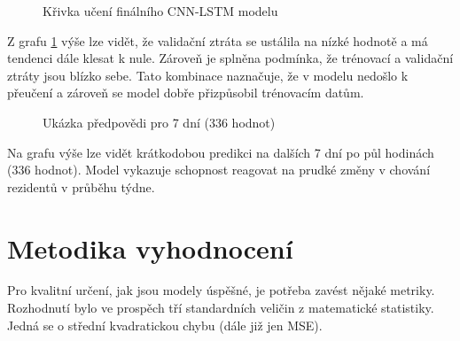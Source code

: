 \documentclass[FM,BP,fonts]{tulthesis}
\begin{document}
\begin{figure}[htbp]
	\centering
	\caption{Křivka učení finálního CNN-LSTM modelu}
	\label{fig:cnn_lstm_learning_curve}
\end{figure}

Z grafu \ref{fig:cnn_lstm_learning_curve} výše lze vidět, že validační ztráta se ustálila na nízké hodnotě a má tendenci dále klesat k nule. Zároveň je splněna podmínka, že  trénovací a validační ztráty jsou blízko sebe. Tato kombinace naznačuje, že v modelu nedošlo k přeučení a zároveň se model dobře přizpůsobil trénovacím datům.

\begin{figure}[htbp]
	\centering
	\caption{Ukázka předpovědi pro 7 dní (336 hodnot)}
	\label{fig:lstm_vyrez}
\end{figure}


Na grafu výše lze vidět krátkodobou predikci na dalších 7 dní po půl hodinách (336 hodnot). Model vykazuje schopnost reagovat na prudké změny v chování rezidentů v průběhu týdne.


\newpage
\section{Metodika vyhodnocení}\label{section:error-matrix}
Pro kvalitní určení, jak jsou modely úspěšné, je potřeba zavést nějaké metriky. Rozhodnutí bylo ve prospěch tří standardních veličin z matematické statistiky. Jedná se o střední kvadratickou chybu (dále již jen MSE). 
\end{document}
